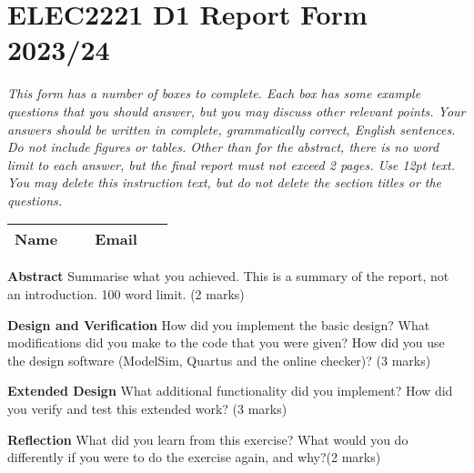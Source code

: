 \documentclass[a4paper,12pt]{article}
\title{}
\author{Mark Zwolinski}
\date{2020-11-15}
\begin{document}
\section*{ELEC2221 D1 Report Form 2023/24}
\textit{This form has a number of boxes to complete. Each box has some example questions that you should answer, but you
may discuss other relevant points. Your answers should be written in complete, grammatically correct, English
sentences. Do not include figures or tables. Other than for the abstract, there is no word limit to each answer, but
the final report must not exceed 2 pages. Use 12pt text. You may delete this instruction text, but do not delete the
section titles or the questions.}


\begin{tabular}{|l|l|l|l|}
\hline
\textbf{Name} &
~
&
\textbf{Email} &
~ \\
\hline
\end{tabular}

\bigskip

\textbf{Abstract }Summarise what you achieved. This is a summary of the report, not an introduction. 100 word limit. \hfill (2 marks)


\bigskip

\textbf{Design and Verification} How did you implement the basic design? What modifications did you make to the code that you were given? How did you use the design software (ModelSim, Quartus and the online checker)? \hfill (3 marks)



\bigskip

\textbf{Extended Design} What additional functionality did you implement? How did you verify and test this extended work? \hfill (3 marks)



\bigskip

\textbf{Reflection }What did you learn from this exercise? What would you do differently if you were to do the exercise
again, and why?\hfill (2 marks)



\bigskip
\end{document}
